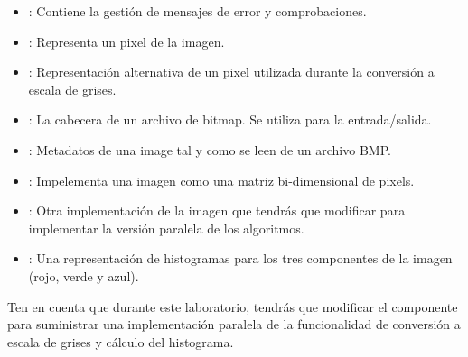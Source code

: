 \begin{itemize}

\item {}: 
Contiene la gestión de mensajes de error y comprobaciones.

\item {}: 
Representa un pixel de la imagen.

\item {}: 
Representación alternativa de un pixel utilizada durante la conversión a escala
de grises.

\item {}: 
La cabecera de un archivo de bitmap. Se utiliza para la entrada/salida.

\item {}: 
Metadatos de una image tal y como se leen de un archivo BMP.

\item {}: 
Impelementa una imagen como una matriz bi-dimensional de pixels.

\item {}: 
Otra implementación de la imagen que tendrás que modificar para implementar la
versión paralela de los algoritmos.

\item {}: 
Una representación de histogramas para los tres componentes de la imagen (rojo,
verde y azul).

\end{itemize}

Ten en cuenta que durante este laboratorio, tendrás que modificar el componente
 para suministrar una implementación paralela de la
funcionalidad de conversión a escala de grises y cálculo del histograma.
